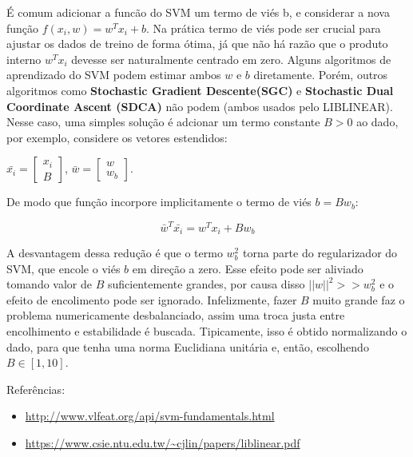 \documentclass[]{article}
\begin{document}
É comum adicionar a funcão do SVM um termo de viés b, e considerar a
nova função \(f(x_i,w) = w^{T}x_i + b\). Na prática termo de viés pode
ser crucial para ajustar os dados de treino de forma ótima, já que não
há razão que o produto interno \(w^{T}x_i\) devesse ser naturalmente
centrado em zero. Alguns algoritmos de aprendizado do SVM podem estimar
ambos \(w\) e \(b\) diretamente. Porém, outros algoritmos como
\textbf{Stochastic Gradient Descente(SGC)} e \textbf{Stochastic Dual
Coordinate Ascent (SDCA)} não podem (ambos usados pelo LIBLINEAR). Nesse
caso, uma simples solução é adcionar um termo constante \(B > 0\) ao
dado, por exemplo, considere os vetores estendidos:

\(\bar{x_i}=\begin{bmatrix} x_i \\ B \end{bmatrix}\),
\(\bar{w}=\begin{bmatrix} w \\ w_b\end{bmatrix}\).

De modo que função incorpore implicitamente o termo de viés
\(b = Bw_b\):

\begin{equation}
  \bar{w}^T\bar{x_i} = w^Tx_i + Bw_b
\end{equation}

A desvantagem dessa redução é que o termo \(w^2_b\) torna parte do
regularizador do SVM, que encole o viés \(b\) em direção a zero. Esse
efeito pode ser aliviado tomando valor de \(B\) suficientemente grandes,
por causa disso \(||w||^2 >> w^2_b\) e o efeito de encolimento pode ser
ignorado. Infelizmente, fazer \(B\) muito grande faz o problema
numericamente desbalanciado, assim uma troca justa entre encolhimento e
estabilidade é buscada. Tipicamente, isso é obtido normalizando o dado,
para que tenha uma norma Euclidiana unitária e, então, escolhendo
\(B \in [1,10]\).

Referências:

\begin{itemize}
\itemsep1pt\parskip0pt
\item
  \url{http://www.vlfeat.org/api/svm-fundamentals.html}
\item
  \url{https://www.csie.ntu.edu.tw/~cjlin/papers/liblinear.pdf}
\end{itemize}
\end{document}
